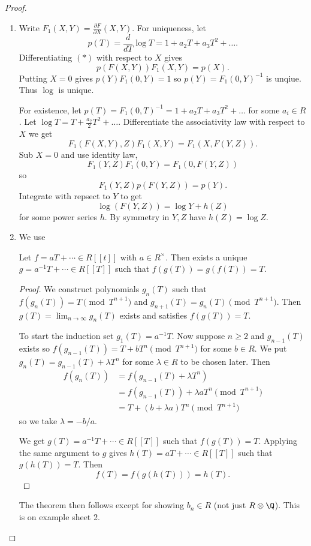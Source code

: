 \documentclass[a4paper]{article}
\theoremstyle{definition}
\begin{document}
\begin{proof}\leavevmode
  \begin{enumerate}
  \item Write \(F_1(X, Y) = \frac{\partial F}{\partial X}(X, Y)\). For uniqueness, let
    \[
      p(T) = \frac{d}{dT} \log T = 1 + a_2 T + a_3 T^2 + \dots.
    \]
    Differentiating \((\ast)\) with respect to \(X\) gives
    \[
      p(F(X, Y)) F_1(X, Y) = p(X).
    \]
    Putting \(X = 0\) gives \(p(Y) F_1(0, Y) = 1\) so \(p(Y) = F_1(0, Y)^{-1}\) is unqiue. Thus \(\log\) is unique.

    For existence, let \(p(T) = F_1(0, T)^{-1} = 1 + a_2 T + a_3 T^2 + \dots\) for some \(a_i \in R\). Let \(\log T = T + \frac{a_2}{2}T^2 + \dots\). Differentiate the associativity law with respect to \(X\) we get
    \[
      F_1(F(X, Y), Z) F_1(X, Y) = F_1(X, F(Y, Z)).
    \]
    Sub \(X = 0\) and use identity law,
    \[
      F_1(Y, Z) F_1(0, Y) = F_1(0, F(Y, Z))
    \]
    so
    \[
      F_1(Y, Z) p(F(Y, Z)) = p(Y).
    \]
    Integrate with repsect to \(Y\) to get
    \[
      \log (F(Y, Z)) = \log Y + h(Z)
    \]
    for some power series \(h\). By symmetry in \(Y, Z\) have \(h(Z) = \log Z\).
  \item
    We use
    \begin{lemma}
      Let \(f = aT + \cdots \in R[[t]]\) with \(a \in R^\times\). Then exists a unique \(g = a^{-1}T + \cdots \in R[[T]]\) such that \(f(g(T)) = g(f(T)) = T\).
    \end{lemma}

    \begin{proof}
      We construct polynomials \(g_n(T)\) such that \(f(g_n(T)) = T \pmod{T^{n + 1}}\) and \(g_{n + 1}(T) = g_n(T) \pmod{T^{n + 1}}\). Then \(g(T) = \lim_{n \to \infty} g_n(T)\) exists and satisfies \(f(g(T)) = T\).

      To start the induction set \(g_1(T) = a^{-1}T\). Now suppose \(n \geq 2\) and \(g_{n - 1}(T)\) exists so \(f(g_{n - 1}(T)) = T + bT^n \pmod{T^{n + 1}}\) for some \(b \in R\). We put \(g_n(T) = g_{n - 1}(T) + \lambda T^n\) for some \(\lambda \in R\) to be chosen later. Then
      \begin{align*}
        f(g_n(T))
        &= f(g_{n - 1}(T) + \lambda T^n) \\
        &= f(g_{n - 1}(T)) + \lambda aT^n \pmod{T^{n + 1}} \\
        &= T + (b + \lambda a)T^n \pmod{T^{n + 1}}
      \end{align*}
      so we take \(\lambda = -b/a\).

      We get \(g(T) = a^{-1}T + \cdots \in R[[T]]\) such that \(f(g(T)) = T\). Applying the same argument to \(g\) gives \(h(T) = aT + \cdots \in R[[T]]\) such that \(g(h(T)) = T\). Then
      \[
        f(T) = f(g(h(T))) = h(T).
      \]
    \end{proof}
    The theorem then follows except for showing \(b_n \in R\) (not just \(R \otimes \Q\)). This is on example sheet 2.
  \end{enumerate}
\end{proof}
\end{document}

